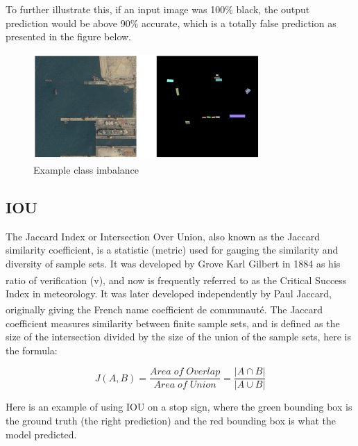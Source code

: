 To further illustrate this, if an input image was 100\% black, the output prediction would be above 90\% accurate, which is a totally false prediction as presented in the figure below.

\vspace{0.1in}

\begin{figure}[H]
\centering
  \vspace{-0.1in}
    \centerline{\includegraphics[width = 3.4in, height = 1.6in]{../images/class_imbalance.png}}
    \caption{Example class imbalance}
\end{figure}

\subsection{IOU}
The Jaccard Index or Intersection Over Union, also known as the Jaccard similarity coefficient, is a statistic (metric) used for gauging the similarity and diversity of sample sets. It was developed by Grove Karl Gilbert in 1884 as his ratio of verification (v),\textsuperscript{\cite{murphy1996finley}} and now is frequently referred to as the Critical Success Index in meteorology. It was later developed independently by Paul Jaccard, originally giving the French name coefficient de communauté.\textsuperscript{\cite{jaccard1912distribution}} The Jaccard coefficient measures similarity between finite sample sets, and is defined as the size of the intersection divided by the size of the union of the sample sets, here is the formula:

\begin{equation}
    J(A,B) = \frac{Area\; of\; Overlap}{Area\; of\; Union} = \frac{|A \cap B|}{|A \cup B|}
\end{equation}

Here is an example of using IOU on a stop sign, where the green bounding box is the ground truth (the right prediction) and the red bounding box is what the model predicted.

\vspace{0.1in}

